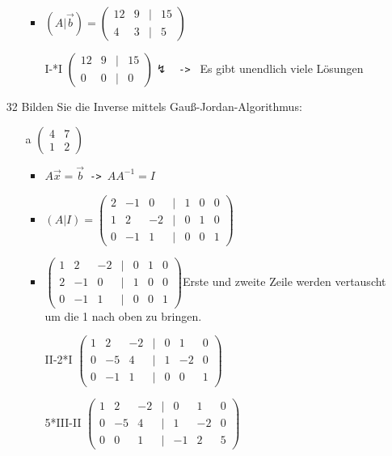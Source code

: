 \documentclass{article}
\begin{document}
\begin{itemize}
\begin{itemize}
			\begin{itemize}
				\item{$(A|\vec{b})=\begin{pmatrix} 12 & 9 & | & 15 \\ 4 & 3 & | & 5 \end{pmatrix}$}
				\item[I-\nicefrac{1}{3}*I]{$\begin{pmatrix} 12 & 9 & | & 15 \\ 0 & 0 & | & 0 \end{pmatrix}\lightning$ \texttt{ -> } Es gibt unendlich viele Lösungen}
			\end{itemize}
		\end{itemize}
		\item[32]{Bilden Sie die Inverse mittels Gauß-Jordan-Algorithmus:}
		\begin{itemize}
			\item[a]{$\begin{pmatrix} 4 & 7 \\ 1 & 2 \end{pmatrix}$}
			\begin{itemize}
				\item{$A \vec{x}=\vec{b}$\texttt{ -> }$AA^{-1}=I$}
				\item{$(A|I)=\begin{pmatrix} 2 & -1 & 0 & | & 1 & 0 & 0 \\ 1 & 2 & -2 & | & 0 & 1 & 0 \\ 0 & -1 & 1 & | & 0 & 0 & 1 \end{pmatrix}$}
				\item{$\begin{pmatrix} 1 & 2 & -2 & | & 0 & 1 & 0 \\ 2 & -1 & 0 & | & 1 & 0 & 0 \\ 0 & -1 & 1 & | & 0 & 0 & 1 \end{pmatrix}$Erste und zweite Zeile werden vertauscht um die 1 nach oben zu bringen.}
				\item[II-2*I]{$\begin{pmatrix} 1 & 2 & -2 & | & 0 & 1 & 0 \\ 0 & -5 & 4 & | & 1 & -2 & 0 \\ 0 & -1 & 1 & | & 0 & 0 & 1 \end{pmatrix}$}
				\item[5*III-II]{$\begin{pmatrix} 1 & 2 & -2 & | & 0 & 1 & 0 \\ 0 & -5 & 4 & | & 1 & -2 & 0 \\ 0 & 0 & 1 & | & -1 & 2 & 5 \end{pmatrix}$}

\end{itemize}
\end{itemize}
\end{itemize}
\end{document}
